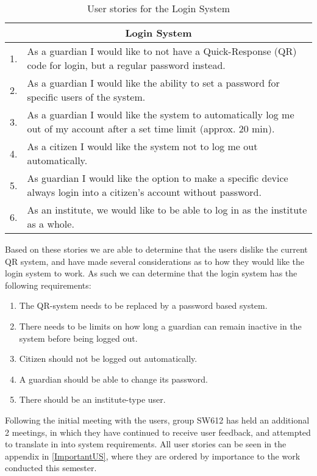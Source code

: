 \begin{table}[H]
\begin{tabular}{|c|p{12.5cm}|}
\hline 
\multicolumn{2}{|c|}{Login System}\\ \hline 
1. & As a guardian I would like to not have a Quick-Response (QR) code for
login, but a regular password instead.\\ \hline 
2. & As a guardian I would like the ability to set a password for specific users
of the system.\\ \hline
3. & As a guardian I would like the system to automatically log me out of my
account after a set time limit (approx. 20 min).\\ \hline
4. & As a citizen I would like the system not to log me out automatically.\\ \hline
5. & As guardian I would like the option to make a specific device always login
into a citizen's account without password.\\ \hline
6. & As an institute, we would like to be able to log in as the institute as a
whole.\\\hline
\end{tabular}
\caption{User stories for the Login System}
\label{UserStoriesLogin}
\end{table}
 
Based on these stories we are able to determine that the users dislike the
current QR system, and have made several considerations as to how they would
like the login system to work. As such we can determine that the login system
has the following requirements:

\begin{enumerate}
   \item The QR-system needs to be replaced by a password based system.
   \item There needs to be limits on how long a guardian can remain inactive in
   the system before being logged out.
   \item Citizen should not be logged out automatically. 
   \item A guardian should be able to change its password.
   \item There should be an institute-type user.
\end{enumerate}

Following the initial meeting with the users, group SW612 has held an additional
2 meetings, in which they have continued to receive user feedback, and attempted
to translate in into system requirements. All user stories can be seen in the
appendix in \autoref{ImportantUS}, where they are ordered by importance to the
work conducted this semester.












